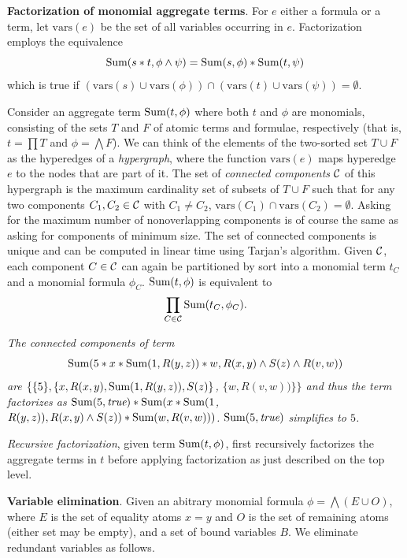\def\vars{\mbox{vars}}

{\bf Factorization of monomial aggregate terms}.
For $e$ either a formula or a term, let $\vars(e)$
be the set of all variables occurring in $e$.
Factorization employs the equivalence
\[
\mbox{Sum}(s*t, \phi \land \psi) = \mbox{Sum}(s, \phi) * \mbox{Sum}(t, \psi)
\]
which is true if
$(\vars(s) \cup \vars(\phi)) \cap (\vars(t) \cup \vars(\psi)) = \emptyset$.

Consider an aggregate term $\mbox{Sum}(t, \phi)$ where both $t$ and $\phi$ are
monomials, consisting of the sets $T$ and $F$ of atomic terms and formulae,
respectively (that is, $t = \prod T$ and $\phi = \bigwedge F$).
We can think of the
elements of the two-sorted set $T \cup F$ as the hyperedges of a
{\em hypergraph},
where the function $\vars(e)$ maps hyperedge $e$ to the nodes that are
part of it.
The set of {\em connected components} ${\cal C}$ of this hypergraph is the
maximum cardinality set of subsets of $T \cup F$ such that for any
two components $C_1, C_2 \in {\cal C}$ with $C_1 \neq C_2$,
$\vars(C_1) \cap \vars(C_2) = \emptyset$. Asking for the maximum number of
nonoverlapping components is of course the same as asking for components of
minimum size. The set of connected components is unique and can be computed
in linear time using Tarjan's algorithm. Given ${\cal C}$, each component
$C \in {\cal C}$ can again be partitioned by sort into a monomial term $t_C$
and a monomial formula $\phi_C$.
%
%
$\mbox{Sum}(t, \phi)$ is equivalent to
\[
\prod_{C \in {\cal C}} \AggSum(t_C, \phi_C).
\]


\begin{example}\em
The connected components of term
\[
\mbox{Sum}(5 * x * \mbox{Sum}(1, R(y, z)) * w, R(x,y) \land S(z) \land R(v, w))
\]
are
$\{ \{5\}, \{ x, R(x,y), \mbox{Sum}(1, R(y, z)), S(z) \}$,
$\{ w, R(v, w)) \} \}$
and thus the term factorizes as
$\mbox{Sum}(5, \textit{true}) *
\mbox{Sum}(x * \mbox{Sum}(1$, $R(y, z)), R(x, y) \land S(z)) *
\mbox{Sum}(w, R(v, w)))$.
$\mbox{Sum}(5, \textit{true})$ simplifies to $5$.
\punto
\end{example}


{\em Recursive factorization}, given term $\mbox{Sum}(t, \phi)$, first recursively
factorizes the aggregate terms in $t$ before applying factorization as
just described on the top level.


{\bf Variable elimination}.
Given an abitrary monomial formula $\phi = \bigwedge (E \cup O)$,
where $E$ is the set of equality
atoms $x=y$ and $O$ is the set of remaining atoms (either set may be empty),
and a set of bound variables $B$.
We eliminate redundant variables as follows.

